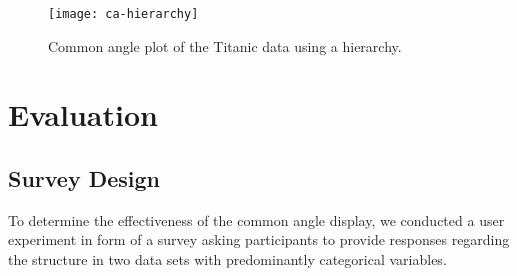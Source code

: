 \begin{figure}[hbtp]
%
%
%
%
%
%
%
%
%
%
%
\texttt{[image: ca-hierarchy]}
\caption{\label{tit-hierarchy} Common angle plot of the Titanic data using a hierarchy. }
\end{figure}


\section{Evaluation}
\subsection{Survey Design}
To determine the effectiveness of the common angle display, we conducted a user experiment in form of a survey asking participants to provide responses regarding the structure in two data sets with predominantly categorical variables.

